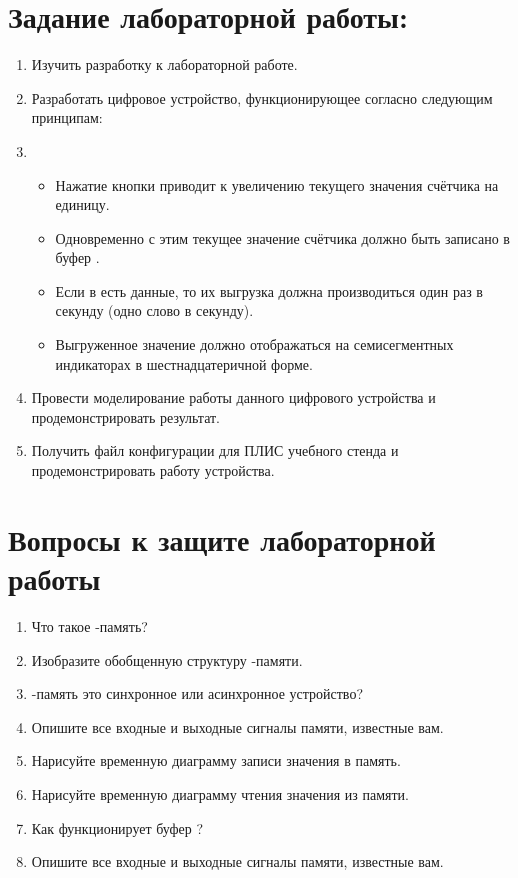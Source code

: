 \section{Задание лабораторной работы:}

\begin{enumerate}%

	\item{Изучить разработку к лабораторной работе.}
	\item{Разработать цифровое устройство, функционирующее согласно следующим принципам:}
	\item{
		\begin{itemize}
			\item{Нажатие кнопки приводит к увеличению текущего значения счётчика на единицу.}
			\item{Одновременно с этим текущее значение счётчика должно быть записано в буфер .}
			\item{Если в  есть данные, то их выгрузка должна производиться один раз в секунду (одно слово в секунду).}
			\item{Выгруженное значение должно отображаться на семисегментных индикаторах в шестнадцатеричной форме.}
		\end{itemize}
	}
	\item{Провести моделирование работы данного цифрового устройства и продемонстрировать результат.}
	\item{Получить файл конфигурации для ПЛИС учебного стенда и продемонстрировать работу устройства.}

\end{enumerate}


\section{Вопросы к защите лабораторной работы}


\begin{enumerate}%

	\item{Что такое -память?}
	\item{Изобразите обобщенную структуру -памяти.}
	\item{-память это синхронное или асинхронное устройство?}
	\item{Опишите все входные и выходные сигналы  памяти, известные вам.}
	\item{Нарисуйте временную диаграмму записи значения в  память.}
	\item{Нарисуйте временную диаграмму чтения значения из  памяти.}
	\item{Как функционирует буфер ?}
	\item{Опишите все входные и выходные сигналы  памяти, известные вам.}

\end{enumerate}
